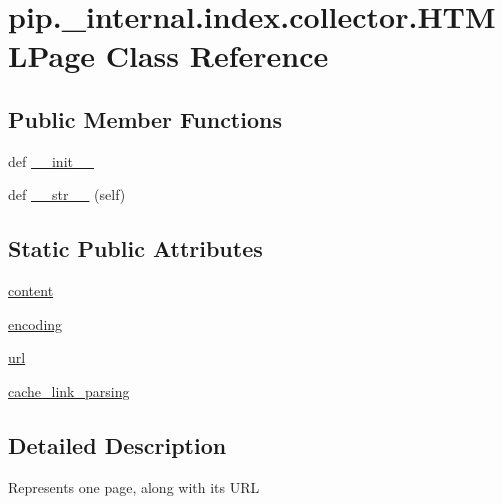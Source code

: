 \hypertarget{classpip_1_1__internal_1_1index_1_1collector_1_1HTMLPage}{}\section{pip.\+\_\+internal.\+index.\+collector.\+H\+T\+M\+L\+Page Class Reference}
\label{classpip_1_1__internal_1_1index_1_1collector_1_1HTMLPage}
\subsection*{Public Member Functions}
\begin{DoxyCompactItemize}
\item 
def \hyperlink{classpip_1_1__internal_1_1index_1_1collector_1_1HTMLPage_a15f11d50fe2184f01a4251860f14ef6b}{\+\_\+\+\_\+init\+\_\+\+\_\+}
\item 
def \hyperlink{classpip_1_1__internal_1_1index_1_1collector_1_1HTMLPage_a8c3e3b095fc46af02518081028fb9867}{\+\_\+\+\_\+str\+\_\+\+\_\+} (self)
\end{DoxyCompactItemize}
\subsection*{Static Public Attributes}
\begin{DoxyCompactItemize}
\item 
\hyperlink{classpip_1_1__internal_1_1index_1_1collector_1_1HTMLPage_a15871495a51631a81eec0a840687a750}{content}
\item 
\hyperlink{classpip_1_1__internal_1_1index_1_1collector_1_1HTMLPage_aeb93b5ec047306900d069e002552894e}{encoding}
\item 
\hyperlink{classpip_1_1__internal_1_1index_1_1collector_1_1HTMLPage_ac9fa1d50eb8ccef27d82a4ed1a92c1a8}{url}
\item 
\hyperlink{classpip_1_1__internal_1_1index_1_1collector_1_1HTMLPage_a6624b4fe3a0f190a73d39688ea3d2945}{cache\+\_\+link\+\_\+parsing}
\end{DoxyCompactItemize}


\subsection{Detailed Description}
\begin{DoxyVerb}Represents one page, along with its URL\end{DoxyVerb}
 

